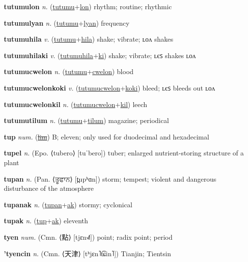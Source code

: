 \textbf{\hypertarget{tutumulon}{tutumulon}} \textit{n.} (\hyperlink{tutumu}{tutumu}+\allowbreak \hyperlink{lon}{lon})
rhythm; routine; rhythmic

\textbf{\hypertarget{tutumulyan}{tutumulyan}} \textit{n.} (\hyperlink{tutumu}{tutumu}+\allowbreak \hyperlink{lyan}{lyan})
frequency

\textbf{\hypertarget{tutumuhila}{tutumuhila}} \textit{v.} (\hyperlink{tutumu}{tutumu}+\allowbreak \hyperlink{hila}{hila})
shake; vibrate; ʟᴏᴧ shakes

\textbf{\hypertarget{tutumuhilaki}{tutumuhilaki}} \textit{v.} (\hyperlink{tutumuhila}{tutumuhila}+\allowbreak \hyperlink{ki}{ki})
shake; vibrate; ʟєꜱ shakes ʟᴏᴧ

\textbf{\hypertarget{tutumucwelon}{tutumucwelon}} \textit{n.} (\hyperlink{tutumu}{tutumu}+\allowbreak \hyperlink{cwelon}{cwelon})
blood

\textbf{\hypertarget{tutumucwelonkoki}{tutumucwelonkoki}} \textit{v.} (\hyperlink{tutumucwelon}{tutumucwelon}+\allowbreak \hyperlink{koki}{koki})
bleed; ʟєꜱ bleeds out ʟᴏᴧ

\textbf{\hypertarget{tutumucwelonkil}{tutumucwelonkil}} \textit{n.} (\hyperlink{tutumucwelon}{tutumucwelon}+\allowbreak \hyperlink{kil}{kil})
leech

\textbf{\hypertarget{tutumutilum}{tutumutilum}} \textit{n.} (\hyperlink{tutumu}{tutumu}+\allowbreak \hyperlink{tilum}{tilum})
magazine; periodical

\textbf{\hypertarget{tup}{tup}} \textit{num.} (\hyperlink{lim}{\sout{lim}})
B; eleven; only used for duodecimal and hexadecimal

\textbf{\hypertarget{tupel}{tupel}} \textit{n.} (Epo. ⟨tubero⟩ [tuˈbero])
tuber; enlarged nutrient-storing structure of a plant

\textbf{\hypertarget{tupan}{tupan}} \textit{n.} (Pan. ⟨{\gurmukhi{}ਤੂਫਾਨ}⟩ [t̪upʰɑn])
storm; tempest; violent and dangerous disturbance of the atmosphere

\textbf{\hypertarget{tupanak}{tupanak}} \textit{n.} (\hyperlink{tupan}{tupan}+\allowbreak \hyperlink{ak}{ak})
stormy; cyclonical

\textbf{\hypertarget{tupak}{tupak}} \textit{n.} (\hyperlink{tup}{tup}+\allowbreak \hyperlink{ak}{ak})
eleventh

\textbf{\hypertarget{tyen}{tyen}} \textit{num.} (Cmn. ⟨{\chinese{}點}⟩ [tjɛn˧˩˥])
point; radix point; period

\textbf{\hypertarget{'tyencin}{'tyencin}} \textit{n.} (Cmn. ⟨{\chinese{}天津}⟩ [tʰjɛn˥t͡ɕin˥])
Tianjin; Tientsin

